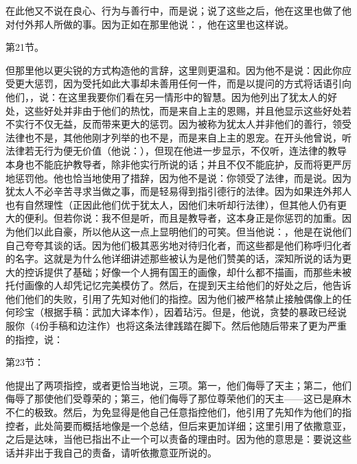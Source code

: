 在此他又不说在良心、行为与善行中，而是说；说了这些之后，他在这里也做了他对付外邦人所做的事。因为正如在那里他说：，他在这里也这样说。\par

第21节。\par

但那里他以更尖锐的方式构造他的言辞，这里则更温和。因为他不是说：因此你应受更大惩罚，因为受托如此大事却未善用任何一件，而是以提问的方式将话语引向他们，，说：在这里我要你们看在另一情形中的智慧。因为他列出了犹太人的好处，这些好处并非由于他们的热忱，而是来自上主的恩赐，并且他显示这些好处若不实行不仅无益，反而带来更大的惩罚。因为被称为犹太人并非他们的善行，领受法律也不是，其他他刚才列举的也不是，而是来自上主的恩宠。在开头他曾说，听法律若无行为便无价值（他说：），但现在他进一步显示，不仅听，连法律的教导本身也不能庇护教导者，除非他实行所说的话；并且不仅不能庇护，反而将更严厉地惩罚他。他也恰当地使用了措辞，因为他不是说：你领受了法律，而是说。因为犹太人不必辛苦寻求当做之事，而是轻易得到指引德行的法律。因为如果连外邦人也有自然理性（正因此他们优于犹太人，因他们未听却行法律），但其他人仍有更大的便利。但若你说：我不但是听，而且是教导者，这本身正是你惩罚的加重。因为他们以此自豪，所以他从这一点上显明他们的可笑。但当他说：，他是在说他们自己夸夸其谈的话。因为他们极其恶劣地对待归化者，而这些都是他们称呼归化者的名字。这就是为什么他详细讲述那些被认为是他们赞美的话，深知所说的话为更大的控诉提供了基础；好像一个人拥有国王的画像，却什么都不描画，而那些未被托付画像的人却凭记忆完美模仿了。然后，在提到天主给他们的好处之后，他告诉他们他们的失败，引用了先知对他们的指控。因为他们被严格禁止接触偶像上的任何珍宝（根据手稿：武加大译本作），因着玷污。但是，他说，贪婪的暴政已经说服你（4份手稿和边注作）也将这条法律践踏在脚下。然后他随后带来了更为严重的指控，说：\par

第23节：\par

他提出了两项指控，或者更恰当地说，三项。第一，他们侮辱了天主；第二，他们侮辱了那使他们受尊荣的；第三，他们侮辱了那位尊荣他们的天主——这已是麻木不仁的极致。然后，为免显得是他自己任意指控他们，他引用了先知作为他们的指控者，此处简要而概括地像是一个总结，但后来更加详细；这里引用了依撒意亚，之后是达味，当他已指出不止一个可以责备的理由时。因为他的意思是：要说这些话并非出于我自己的责备，请听依撒意亚所说的。\par

